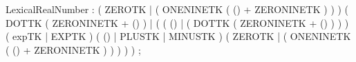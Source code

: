 %
%
%
\begin{rail}
LexicalRealNumber : ( ZEROTK | ( ONENINETK ( () + ZERONINETK ) ) )
                    ( DOTTK ( ZERONINETK + () )
                    | ( ( () | ( DOTTK ( ZERONINETK + () ) ) )
                        ( expTK | EXPTK ) ( () | PLUSTK | MINUSTK )
                        ( ZEROTK | ( ONENINETK ( () + ZERONINETK ) ) )
                        ) )
                    ;
\end{rail}
